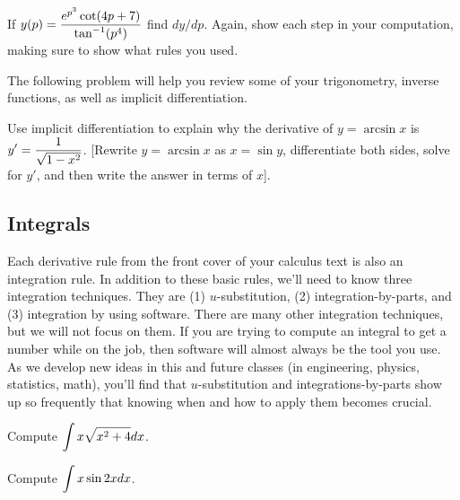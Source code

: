 \begin{problem}
If $y(p) = \displaystyle \frac{e^{p^3}\cot(4p+7)}{\tan^{-1}(p^4)}$ find $dy/dp$. Again, show each step in your computation, making sure to show what rules you used.
\end{problem}

The following problem will help you review some of your trigonometry, inverse functions, as well as implicit differentiation.

\begin{problem}
Use implicit differentiation to explain why the derivative of $y=\arcsin x$ is $\displaystyle y'=\frac{1}{\sqrt{1-x^2}}$.  [Rewrite $y=\arcsin x$ as $x=\sin y$, differentiate both sides, solve for $y'$, and then write the answer in terms of $x$].  
\end{problem}


\subsection{Integrals}
Each derivative rule from the front cover of your calculus text is also an integration rule. In addition to these basic rules, we'll need to know three integration techniques.  They are 
(1) {$u$}-substitution,
(2) integration-by-parts, and
(3) integration by using software. 
There are many other integration techniques, but we will not focus on them. If you are trying to compute an integral to get a number while on the job, then software will almost always be the tool you use.  As we develop new ideas in this and future classes (in engineering, physics, statistics, math), you'll find that $u$-substitution and integrations-by-parts show up so frequently that knowing when and how to apply them becomes crucial.

\begin{problem}
Compute $\displaystyle\int x\sqrt{x^2+4}dx$.
\end{problem}

\begin{problem}
Compute $\displaystyle\int x\sin 2x dx$.
\end{problem}

